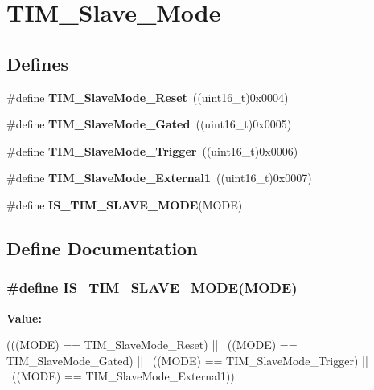 \hypertarget{group__TIM__Slave__Mode}{
\section{TIM\_\-Slave\_\-Mode}
\label{group__TIM__Slave__Mode}
}
\subsection*{Defines}
\begin{DoxyCompactItemize}
\item 
\hypertarget{group__TIM__Slave__Mode_gaac1cec731f1a5e680a038c4f472f74af}{
\#define {\bfseries TIM\_\-SlaveMode\_\-Reset}~((uint16\_\-t)0x0004)}
\label{group__TIM__Slave__Mode_gaac1cec731f1a5e680a038c4f472f74af}

\item 
\hypertarget{group__TIM__Slave__Mode_ga1f36c870b926f70b32f274bbc0bc39a5}{
\#define {\bfseries TIM\_\-SlaveMode\_\-Gated}~((uint16\_\-t)0x0005)}
\label{group__TIM__Slave__Mode_ga1f36c870b926f70b32f274bbc0bc39a5}

\item 
\hypertarget{group__TIM__Slave__Mode_ga9e7726c04ee1bafec97226f08adf5677}{
\#define {\bfseries TIM\_\-SlaveMode\_\-Trigger}~((uint16\_\-t)0x0006)}
\label{group__TIM__Slave__Mode_ga9e7726c04ee1bafec97226f08adf5677}

\item 
\hypertarget{group__TIM__Slave__Mode_ga34427a693157ab177fead9871185bd35}{
\#define {\bfseries TIM\_\-SlaveMode\_\-External1}~((uint16\_\-t)0x0007)}
\label{group__TIM__Slave__Mode_ga34427a693157ab177fead9871185bd35}

\item 
\#define {\bfseries IS\_\-TIM\_\-SLAVE\_\-MODE}(MODE)
\end{DoxyCompactItemize}


\subsection{Define Documentation}
\hypertarget{group__TIM__Slave__Mode_ga7f0e666bc968c56df7f1f6c2465c89fb}{
\subsubsection[{IS\_\-TIM\_\-SLAVE\_\-MODE}]{\setlength{\rightskip}{0pt plus 5cm}\#define IS\_\-TIM\_\-SLAVE\_\-MODE(MODE)}}
\label{group__TIM__Slave__Mode_ga7f0e666bc968c56df7f1f6c2465c89fb}
{\bfseries Value:}
\begin{DoxyCode}
(((MODE) == TIM_SlaveMode_Reset) || \
                                 ((MODE) == TIM_SlaveMode_Gated) || \
                                 ((MODE) == TIM_SlaveMode_Trigger) || \
                                 ((MODE) == TIM_SlaveMode_External1))
\end{DoxyCode}
